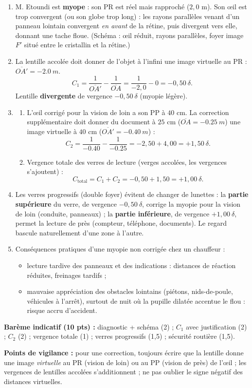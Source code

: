 \documentclass[11pt]{article}
\begin{document}
\begin{corrige}
\begin{enumerate}
\item M. Etoundi est \textbf{myope} : son PR est réel mais rapproché ($2{,}0$ m). Son œil est trop convergent (ou son globe trop long) : les rayons parallèles venant d'un panneau lointain convergent \emph{en avant} de la rétine, puis divergent vers elle, donnant une tache floue. (Schéma : œil réduit, rayons parallèles, foyer image $F'$ situé entre le cristallin et la rétine.)
\item La lentille accolée doit donner de l'objet à l'infini une image virtuelle au PR : $\overline{OA'} = -\SI{2,0}{m}$.
\[ C_1 = \frac{1}{\overline{OA'}} - \frac{1}{\overline{OA}} = \frac{1}{-2,0} - 0 = -0,50\ \delta. \]
Lentille \textbf{divergente} de vergence $-0,50\ \delta$ (myopie légère).
\item \begin{enumerate}
\item L'œil corrigé pour la vision de loin a son PP à $40$ cm. La correction supplémentaire doit donner du document à $25$ cm ($\overline{OA} = -\SI{0,25}{m}$) une image virtuelle à $40$ cm ($\overline{OA'} = -\SI{0,40}{m}$) :
\[ C_2 = \frac{1}{-\num{0,40}} - \frac{1}{-\num{0,25}} = -2,50 + 4,00 = +1,50\ \delta. \]
\item Vergence totale des verres de lecture (verges accolées, les vergences s'ajoutent) :
\[ C_{\text{total}} = C_1 + C_2 = -0,50 + 1,50 = +1,00\ \delta. \]
\end{enumerate}
\item Les verres progressifs (double foyer) évitent de changer de lunettes : la \textbf{partie supérieure} du verre, de vergence $-0,50\ \delta$, corrige la myopie pour la vision de loin (conduite, panneaux) ; la \textbf{partie inférieure}, de vergence $+1,00\ \delta$, permet la lecture de près (compteur, téléphone, documents). Le regard bascule naturellement d'une zone à l'autre.
\item Conséquences pratiques d'une myopie non corrigée chez un chauffeur :
\begin{itemize}
\item lecture tardive des panneaux et des indications : distances de réaction réduites, freinages tardifs ;
\item mauvaise appréciation des obstacles lointains (piétons, nids-de-poule, véhicules à l'arrêt), surtout de nuit où la pupille dilatée accentue le flou : risque accru d'accident.
\end{itemize}
\end{enumerate}
\textbf{Barème indicatif (10 pts) :} diagnostic + schéma (2) ; $C_1$ avec justification (2) ; $C_2$ (2) ; vergence totale (1) ; verres progressifs (1,5) ; sécurité routière (1,5).\par
\textbf{Points de vigilance :} pour une correction, toujours écrire que la lentille donne une image \emph{virtuelle} au PR (vision de loin) ou au PP (vision de près) de l'œil ; les vergences de lentilles accolées s'additionnent ; ne pas oublier le signe négatif des distances virtuelles.
\end{corrige}
\end{document}
